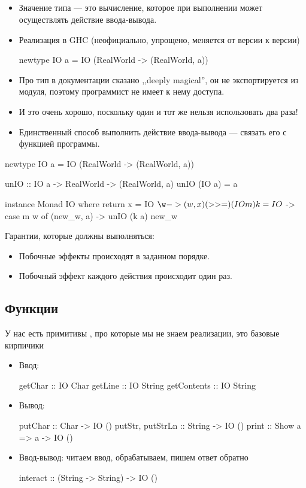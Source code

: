 \documentclass[11pt,a4paper]{article}
\begin{document}
\subsection{}
\begin{itemize}
	\item Значение типа  --- это вычисление, которое при выполнении может осуществлять действие ввода-вывода.
	\item Реализация в GHC (неофициально, упрощено, меняется от версии к версии)
		\begin{hscode}
newtype IO a = IO (RealWorld -> (RealWorld, a))
		\end{hscode}
	\item Про тип  в документации сказано ,,deeply magical'', он не экспортируется из модуля, поэтому программист не имеет к нему доступа.
	\item И это очень хорошо, поскольку один и тот же  нельзя использовать два раза!
	\item Единственный способ выполнить действие ввода-вывода --- связать его с функцией  программы.
\end{itemize}
\begin{hscode}
newtype IO a = IO (RealWorld -> (RealWorld, a))

unIO :: IO a -> RealWorld -> (RealWorld, a)
unIO (IO a) = a

instance Monad IO where
	return x = IO $ \w -> (w, x)
	(>>=) (IO m) k = IO $ \w -> case m w of (new_w, a) -> unIO (k a) new_w
\end{hscode}
Гарантии, которые должны выполняться:
\begin{itemize}
	\item Побочные эффекты происходят в заданном порядке.
	\item Побочный эффект каждого действия происходит один раз.
\end{itemize}

\subsection{Функции}
У нас есть примитивы , про которые мы не знаем реализации, это базовые кирпичики
\begin{itemize}
	\item Ввод:
		\begin{hscode}
getChar :: IO Char
getLine :: IO String
getContents :: IO String
		\end{hscode}
	\item Вывод:
\begin{hscode}
putChar :: Char -> IO ()
putStr, putStrLn :: String -> IO ()
print :: Show a => a -> IO ()
\end{hscode}
\item Ввод-вывод: читаем ввод, обрабатываем, пишем ответ обратно
	\begin{hscode}
interact :: (String -> String) -> IO ()
	\end{hscode}
\end{itemize}
\end{document}
